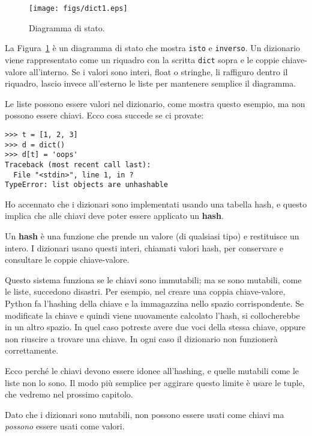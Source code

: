 \documentclass[10pt]{book}
\begin{document}
\begin{figure}
\centerline
{\texttt{[image: figs/dict1.eps]}}
\caption{Diagramma di stato.}
\label{fig.dict1}
\end{figure}

La Figura~\ref{fig.dict1} è un diagramma di stato che mostra {\tt isto} e {\tt inverso}.
Un dizionario viene rappresentato come un riquadro con la scritta {\tt dict} sopra e le coppie chiave-valore all'interno. Se i valori sono interi, float o stringhe, li raffiguro dentro il riquadro, lascio invece all'esterno le liste per mantenere semplice il diagramma.

Le liste possono essere valori nel dizionario, come mostra questo esempio, ma non possono essere chiavi. Ecco cosa succede se ci provate:


\begin{verbatim}
>>> t = [1, 2, 3]
>>> d = dict()
>>> d[t] = 'oops'
Traceback (most recent call last):
  File "<stdin>", line 1, in ?
TypeError: list objects are unhashable
\end{verbatim}
%
Ho accennato che i dizionari sono implementati usando una tabella hash, e questo implica che alle chiavi deve poter essere applicato un {\bf hash}.

Un {\bf hash} è una funzione che prende un valore (di qualsiasi tipo) e restituisce un intero. I dizionari usano questi interi, chiamati valori hash, per conservare e consultare le coppie chiave-valore.

Questo sistema funziona se le chiavi sono immutabili; ma se sono mutabili, come le liste, succedono disastri. Per esempio, nel creare una coppia chiave-valore, Python fa l'hashing della chiave e la immagazzina nello spazio corrispondente. Se modificate la chiave e quindi viene nuovamente calcolato l'hash, si collocherebbe in un altro spazio. In quel caso potreste avere due voci della stessa chiave, oppure non riuscire a trovare una chiave. In ogni caso il dizionario non funzionerà correttamente.

Ecco perché le chiavi devono essere idonee all'hashing, e quelle mutabili come le liste non lo sono. Il modo più semplice per aggirare questo limite è usare le tuple, che vedremo nel prossimo capitolo.

Dato che i dizionari sono mutabili, non possono essere usati come chiavi ma {\em possono} essere usati come valori.
\end{document}
